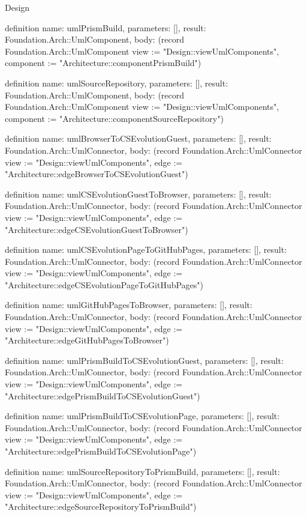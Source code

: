 \begin{lexlean}{Design}
\begin{semanticmodule}
definition{
  name: umlPrismBuild,
  parameters: [],
  result: Foundation.Arch::UmlComponent,
  body: (record Foundation.Arch::UmlComponent {view := "Design::viewUmlComponents", component := "Architecture::componentPrismBuild"})
}

definition{
  name: umlSourceRepository,
  parameters: [],
  result: Foundation.Arch::UmlComponent,
  body: (record Foundation.Arch::UmlComponent {view := "Design::viewUmlComponents", component := "Architecture::componentSourceRepository"})
}

definition{
  name: umlBrowserToCSEvolutionGuest,
  parameters: [],
  result: Foundation.Arch::UmlConnector,
  body: (record Foundation.Arch::UmlConnector {view := "Design::viewUmlComponents", edge := "Architecture::edgeBrowserToCSEvolutionGuest"})
}

definition{
  name: umlCSEvolutionGuestToBrowser,
  parameters: [],
  result: Foundation.Arch::UmlConnector,
  body: (record Foundation.Arch::UmlConnector {view := "Design::viewUmlComponents", edge := "Architecture::edgeCSEvolutionGuestToBrowser"})
}

definition{
  name: umlCSEvolutionPageToGitHubPages,
  parameters: [],
  result: Foundation.Arch::UmlConnector,
  body: (record Foundation.Arch::UmlConnector {view := "Design::viewUmlComponents", edge := "Architecture::edgeCSEvolutionPageToGitHubPages"})
}

definition{
  name: umlGitHubPagesToBrowser,
  parameters: [],
  result: Foundation.Arch::UmlConnector,
  body: (record Foundation.Arch::UmlConnector {view := "Design::viewUmlComponents", edge := "Architecture::edgeGitHubPagesToBrowser"})
}

definition{
  name: umlPrismBuildToCSEvolutionGuest,
  parameters: [],
  result: Foundation.Arch::UmlConnector,
  body: (record Foundation.Arch::UmlConnector {view := "Design::viewUmlComponents", edge := "Architecture::edgePrismBuildToCSEvolutionGuest"})
}

definition{
  name: umlPrismBuildToCSEvolutionPage,
  parameters: [],
  result: Foundation.Arch::UmlConnector,
  body: (record Foundation.Arch::UmlConnector {view := "Design::viewUmlComponents", edge := "Architecture::edgePrismBuildToCSEvolutionPage"})
}

definition{
  name: umlSourceRepositoryToPrismBuild,
  parameters: [],
  result: Foundation.Arch::UmlConnector,
  body: (record Foundation.Arch::UmlConnector {view := "Design::viewUmlComponents", edge := "Architecture::edgeSourceRepositoryToPrismBuild"})
}


\end{semanticmodule}
\end{lexlean}
